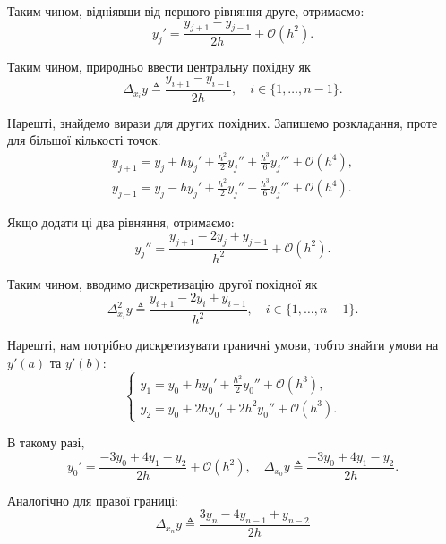 \documentclass{test_template}
\begin{document}
Таким чином, відніявши від першого рівняння друге, отримаємо:
\begin{equation*}
    y_j' = \frac{y_{j+1}-y_{j-1}}{2h} + \mathcal{O}(h^2).
\end{equation*}

Таким чином, природньо ввести центральну похідну як
\begin{equation*}
    \Delta_{x_i}y \triangleq \frac{y_{i+1}-y_{i-1}}{2h}, \quad i \in \{1,\dots,n-1\}.
\end{equation*}

Нарешті, знайдемо вирази для других похідних. Запишемо розкладання, проте 
для більшої кількості точок:
\begin{gather*}
    y_{j+1} = y_j + hy_j' + \frac{h^2}{2}y_{j}'' + \frac{h^3}{6}y_{j}''' + \mathcal{O}(h^4), \\
    y_{j-1} = y_j - hy_j' + \frac{h^2}{2}y_{j}'' - \frac{h^3}{6}y_{j}''' + \mathcal{O}(h^4).
\end{gather*}

Якщо додати ці два рівняння, отримаємо:
\begin{equation*}
    y_{j}'' = \frac{y_{j+1} - 2y_j + y_{j-1}}{h^2} + \mathcal{O}(h^2).
\end{equation*}

Таким чином, вводимо дискретизацію другої похідної як
\begin{equation*}
    \Delta^2_{x_i}y \triangleq \frac{y_{i+1} - 2y_i + y_{i-1}}{h^2}, \quad i \in \{1,\dots,n-1\}.
\end{equation*}

Нарешті, нам потрібно дискретизувати граничні умови, тобто знайти умови 
на $y'(a)$ та $y'(b)$:
\begin{equation*}
    \begin{cases}
        y_1 = y_0 + hy_0' + \frac{h^2}{2}y_0'' + \mathcal{O}(h^3), \\
        y_2 = y_0 + 2hy_0' + 2h^2y_0'' + \mathcal{O}(h^3).
    \end{cases}
\end{equation*}

В такому разі,
\begin{equation*}
    y_0' = \frac{-3y_0 + 4y_1 - y_2}{2h} + \mathcal{O}(h^2), \quad 
    \Delta_{x_0}y \triangleq \frac{-3y_0 + 4y_1 - y_2}{2h}.
\end{equation*}

Аналогічно для правої границі:
\begin{equation*}
    \Delta_{x_n}y \triangleq \frac{3y_n - 4y_{n-1}+y_{n-2}}{2h}
\end{equation*}
\end{document}
